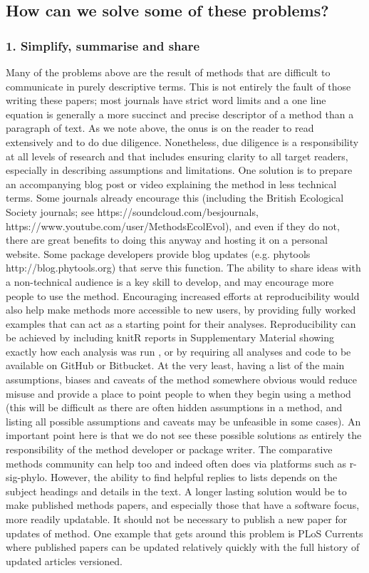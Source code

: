 \documentclass[a4paper,12pt]{article}
\begin{document}
\subsection{How can we solve some of these problems?}
  \subsubsection{1. Simplify, summarise and share}
    Many of the problems above are the result of methods that are difficult to communicate in purely descriptive terms.
    This is not entirely the fault of those writing these papers; most journals have strict word limits and a one line equation is generally a more succinct and precise descriptor of a method than a paragraph of text. 
    As we note above, the onus is on the reader to read extensively and to do due diligence.
    Nonetheless, due diligence is a responsibility at all levels of research and that includes ensuring clarity to all target readers, especially in describing assumptions and limitations.
    One solution is to prepare an accompanying blog post or video explaining the method in less technical terms. 
    Some journals already encourage this (including the British Ecological Society journals; see https://soundcloud.com/besjournals, https://www.youtube.com/user/MethodsEcolEvol), and even if they do not, there are great benefits to doing this anyway and hosting it on a personal website. 
    Some package developers provide blog updates (e.g. phytools http://blog.phytools.org) that serve this function. 
    The ability to share ideas with a non-technical audience is a key skill to develop, and may encourage more people to use the method.
    Encouraging increased efforts at reproducibility would also help make methods more accessible to new users, by providing fully worked examples that can act as a starting point for their analyses.
    Reproducibility can be achieved by including knitR \citep{Xie:2015aa} reports in Supplementary Material showing exactly how each analysis was run \citep[e.g.][]{fitzjohn2014much}, or by requiring all analyses and code to be available on GitHub or Bitbucket. 
    At the very least, having a list of the main assumptions, biases and caveats of the method somewhere obvious would reduce misuse and provide a place to point people to when they begin using a method (this will be difficult as there are often hidden assumptions in a method, and listing all possible assumptions and caveats may be unfeasible in some cases).
    An important point here is that we do not see these possible solutions as entirely the responsibility of the method developer or package writer. 
    The comparative methods community can help too and indeed often does via platforms such as r-sig-phylo.
    However, the ability to find helpful replies to lists depends on the subject headings and details in the text.
    A longer lasting solution would be to make published methods papers, and especially those that have a software focus, more readily updatable. 
    It should not be necessary to publish a new paper for updates of method.
    One example that gets around this problem is PLoS Currents where published papers can be updated relatively quickly with the full history of updated articles versioned.
    
\end{document}
